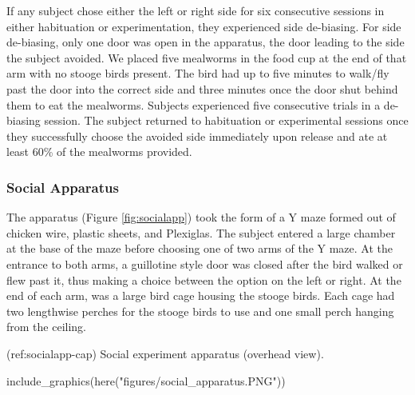 \documentclass[
]{article}
\newenvironment{Shaded}{\begin{snugshade}}{\end{snugshade}}
\newcommand{\FunctionTok}[1]{\textcolor[rgb]{0.00,0.00,0.00}{#1}}
\newcommand{\NormalTok}[1]{#1}
\newcommand{\StringTok}[1]{\textcolor[rgb]{0.31,0.60,0.02}{#1}}
\begin{document}
If any subject chose either the left or right side for six consecutive
sessions in either habituation or experimentation, they experienced side
de-biasing. For side de-biasing, only one door was open in the
apparatus, the door leading to the side the subject avoided. We placed
five mealworms in the food cup at the end of that arm with no stooge
birds present. The bird had up to five minutes to walk/fly past the door
into the correct side and three minutes once the door shut behind them
to eat the mealworms. Subjects experienced five consecutive trials in a
de-biasing session. The subject returned to habituation or experimental
sessions once they successfully choose the avoided side immediately upon
release and ate at least 60\% of the mealworms provided.

\hypertarget{social-apparatus}{%
\subsubsection{Social Apparatus}\label{social-apparatus}}

The apparatus (Figure \ref{fig:socialapp}) took the form of a Y maze
formed out of chicken wire, plastic sheets, and Plexiglas. The subject
entered a large chamber at the base of the maze before choosing one of
two arms of the Y maze. At the entrance to both arms, a guillotine style
door was closed after the bird walked or flew past it, thus making a
choice between the option on the left or right. At the end of each arm,
was a large bird cage housing the stooge birds. Each cage had two
lengthwise perches for the stooge birds to use and one small perch
hanging from the ceiling.

(ref:socialapp-cap) Social experiment apparatus (overhead view).

\begin{Shaded}
\begin{Highlighting}[]
\FunctionTok{include\_graphics}\NormalTok{(}\FunctionTok{here}\NormalTok{(}\StringTok{"figures/social\_apparatus.PNG"}\NormalTok{))}
\end{Highlighting}
\end{Shaded}
\end{document}

